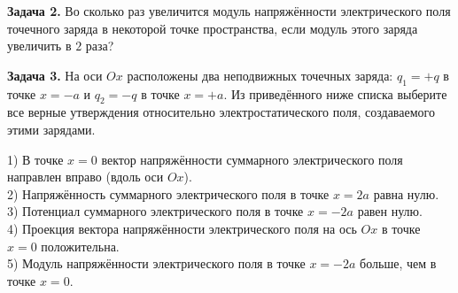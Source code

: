 \begin{taskbasic}[code={\label{task:elem_coulomb_v8_n11}}]
\textbf{Задача 2.} Во сколько раз увеличится модуль напряжённости электрического поля точечного заряда в некоторой точке пространства, если модуль этого заряда увеличить в $2$ раза?

\end{taskbasic}

\begin{taskbasic}[code={\label{task:elem_coulomb_v11_n14}}]
\textbf{Задача 3.} На оси $Ox$ расположены два неподвижных точечных заряда: $q_1 = +q$ в точке $x = -a$ и $q_2 = -q$ в точке $x = +a$. Из приведённого ниже списка выберите все верные утверждения относительно электростатического поля, создаваемого этими зарядами.

\nopagebreak\smallskip
\begin{center}
\end{center}

1) В точке $x = 0$ вектор напряжённости суммарного электрического поля направлен вправо (вдоль оси $Ox$).\\
2) Напряжённость суммарного электрического поля в точке $x = 2a$ равна нулю.\\
3) Потенциал суммарного электрического поля в точке $x = -2a$ равен нулю.\\
4) Проекция вектора напряжённости электрического поля на ось $Ox$ в точке $x = 0$ положительна.\\
5) Модуль напряжённости электрического поля в точке $x = -2a$ больше, чем в точке $x = 0$.

\end{taskbasic}

